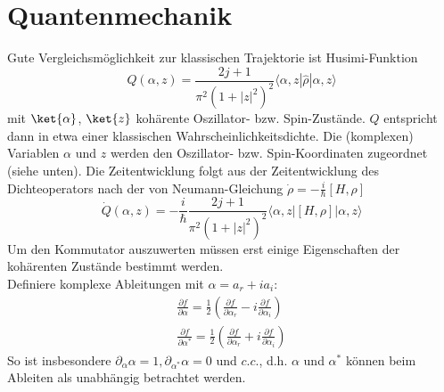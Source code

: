 
\section{Quantenmechanik}
Gute Vergleichsmöglichkeit zur klassischen Trajektorie ist Husimi-Funktion 
\begin{equation*}
  Q(\alpha,z) = \frac{2j+1}{\pi^2(1+|z|^2)^2} \langle\alpha,z|\hat{\rho}|\alpha,z\rangle
\end{equation*}
mit $\ket{\alpha}$, $\ket{z}$ kohärente Oszillator- bzw. Spin-Zustände.
$Q$ entspricht dann in etwa einer klassischen Wahrscheinlichkeitsdichte.
Die (komplexen) Variablen $\alpha$ und $z$ werden den Oszillator- bzw. Spin-Koordinaten zugeordnet (siehe unten).
Die Zeitentwicklung folgt aus der Zeitentwicklung des Dichteoperators nach der von Neumann-Gleichung $\dot\rho = -\frac{i}{\hbar} [H,\rho]$
\begin{equation*}
  \dot Q(\alpha,z) =-\frac{i}{\hbar} \frac{2j+1}{\pi^2(1+|z|^2)^2} \langle\alpha,z|[H,\rho]|\alpha,z\rangle
\end{equation*}
Um den Kommutator auszuwerten müssen erst einige Eigenschaften der kohärenten Zustände bestimmt werden.\\
Definiere komplexe Ableitungen mit $\alpha = a_r + i a_i$:
\begin{align*}
  \frac{\partial f}{\partial \alpha} = \frac12 \left( \frac{\partial f}{\partial \alpha_r} - i \frac{\partial f}{\partial \alpha_i}  \right)\\
  \frac{\partial f}{\partial \alpha^*} = \frac12 \left( \frac{\partial f}{\partial \alpha_r} + i \frac{\partial f}{\partial \alpha_i}  \right)
\end{align*}
So ist insbesondere $\partial_\alpha \alpha =1, \partial_{\alpha^*} \alpha = 0$ und $c.c.$, d.h. $\alpha$ und $\alpha^*$ können beim Ableiten als unabhängig betrachtet werden.
\pagebreak
